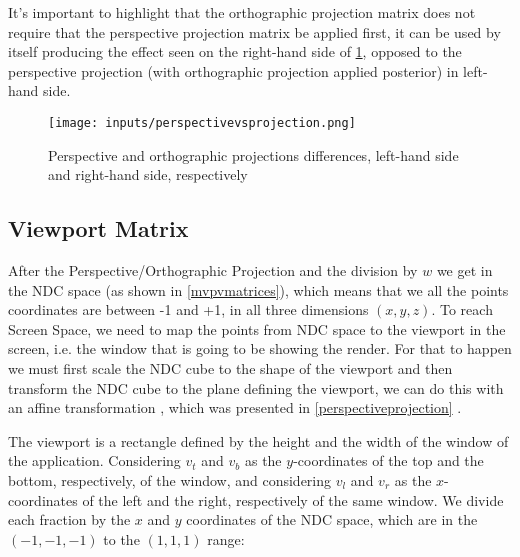 \documentclass[cic,tc,english]{iiufrgs}
\begin{document}
It's important to highlight that the orthographic projection matrix does not require that the perspective projection matrix be applied first, it can be used by itself producing the effect seen on the right-hand side of \cref{perspectivevsprojection}, opposed to the perspective projection (with orthographic projection applied posterior) in left-hand side.

\begin{figure}[hbt!]
    \caption{Perspective and orthographic projections differences, left-hand side and right-hand side, respectively}
    \begin{center}
        \texttt{[image: inputs/perspectivevsprojection.png]}
    \end{center}
    \label{perspectivevsprojection}
\end{figure}


\subsection{Viewport Matrix}
After the Perspective/Orthographic Projection and the division by $w$ we get in the NDC space (as shown in \cref{mvpvmatrices}), which means that we all the points coordinates are between -1 and +1, in all three dimensions $(x,y,z)$. To reach Screen Space, we need to map the points from NDC space to the viewport in the screen, i.e. the window that is going to be showing the render. For that to happen we must first scale the NDC cube to the shape of the viewport and then transform the NDC cube to the plane defining the viewport, we can do this with an affine transformation \cite{Marschner2021CGFundamentals}, which was presented in \cref{perspectiveprojection} .


The viewport is a rectangle defined by the height and the width of the window of the application. Considering $v_t$ and $v_b$ as the $y$-coordinates of the top and the bottom, respectively, of the window, and considering $v_l$ and $v_r$ as the $x$-coordinates of the left and the right, respectively of the same window. We divide each fraction by the $x$ and $y$ coordinates of the NDC space, which are in the $(-1,-1,-1)$ to the  $(1,1,1)$ range:
\end{document}
